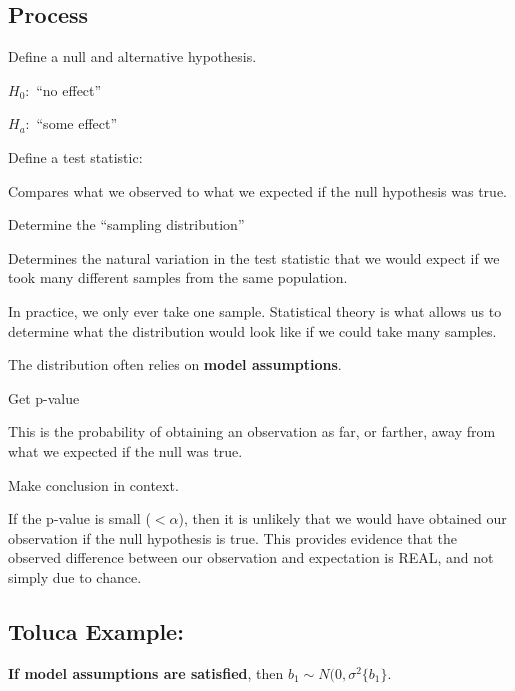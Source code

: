 \documentclass[12pt]{notes}
\begin{document}
\subsection*{Process}
\bi
\item Define a null and alternative hypothesis. 
\bi
\item $H_0:$ ``no effect''
\item $H_a:$ ``some effect''
\ei
\item Define a test statistic:
\bi
\item Compares what we observed to what we expected if the null hypothesis was true. 
\ei
\item Determine the ``sampling distribution''
\bi
\item Determines the natural variation in the test statistic that we would expect if we took many different samples from the same population. 
\item In practice, we only ever take one sample. Statistical theory is what allows us to determine what the distribution would look like if we could take many samples. 
\item The distribution often relies on \textbf{model assumptions}. 
\ei
\item Get p-value
\bi
\item This is the probability of obtaining an observation as far, or farther, away from what we expected if the null was true. 
\ei
\item Make conclusion in context.
\bi
\item If the p-value is small ($<\alpha$), then it is unlikely that we would have obtained our observation if the null hypothesis is true. This provides evidence that the observed difference between our observation and expectation is REAL, and not simply due to chance. 
\ei
\ei

\subsection{Toluca Example:}
\textbf{If model assumptions are satisfied}, then $b_1 \sim N(0, \sigma^2\{b_1\}$.  

\begin{minipage}[l][2cm][c]{\textwidth}
\end{minipage}
\end{document}
